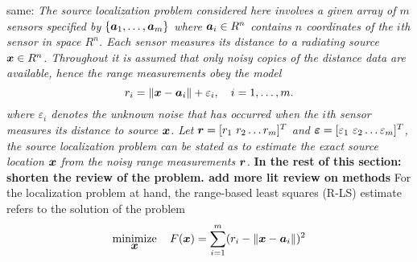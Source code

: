 


same:
\emph{The source localization problem considered here involves a given array of $m$ sensors specified by $\{\mbox{\boldmath$a$}_1,\ldots, \mbox{\boldmath$a$}_m\}$ where $\mbox{\boldmath$a$}_i\in R^n$  contains  $n$ coordinates of the $i$th sensor in space $R^n$. Each sensor measures its distance to a radiating source $\mbox{\boldmath$x$}\in R^n$. Throughout it is assumed that only noisy copies of the distance data are available, hence the \textit{range measurements} obey the model
\begin{equation} \label{eq:4.1}
\setcounter{equation}{1}
r_i = \|{\Bx} - {\Ba}_i\| + \varepsilon_i, \quad i = 1, \ldots , m.
\end{equation}    
where $\varepsilon_i$ denotes the unknown noise that has occurred when the $i$th sensor measures its distance to source $\mbox{\boldmath$x$}$. Let $\mbox{\boldmath$r$}=[r_1 \ r_2 \ldots r_m]^T$ and $\mbox{\boldmath${\varepsilon}$}=[\varepsilon_1 \ \varepsilon_2 \ldots \varepsilon_m]^T$, the source localization problem can be stated as to estimate the exact source location $\mbox{\boldmath$x$}$ from the noisy range measurements $\mbox{\boldmath$r$}$. }
\textbf{In the rest of this section: shorten the review of the problem. add more lit review on methods}
For the localization problem at hand, the range-based least squares (R-LS) estimate refers to the solution of the problem
\begin{equation}\label{eq:4.2} %
\Min_{\Bx} \quad F(\Bx)=\sum_{i=1}^{m} (r_i - \|{\Bx} - {\Ba}_i\|)^2
\end{equation}

